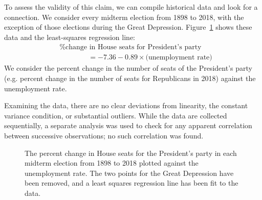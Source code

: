 To assess the validity of this claim, we can compile
historical data and look for a connection.
We consider every midterm election from 1898 to 2018,
with the exception of those elections during the Great
Depression.
Figure~\ref{unemploymentAndChangeInHouse} shows these data
and the least-squares regression line: \vspace{-2mm}
\begin{align*}
&\text{\% change in House seats for President's party}  \\
&\qquad\qquad= -7.36 - 0.89 \times \text{(unemployment rate)}
\end{align*}
We consider the percent change in the number of seats
of the President's party (e.g. percent change in the number
of seats for Republicans in 2018) against the unemployment
rate.

Examining the data, there are no clear deviations from
linearity, the constant variance condition,
or substantial outliers.
While the data are collected sequentially, a separate analysis
was used to check for any apparent correlation between successive
observations;
no such correlation was found.

\begin{figure}[h]
  \centering
  \caption{The percent change in House seats for the
      President's party in each midterm election from 1898 to 2018
      plotted against the unemployment rate.
      The two points for the Great Depression have been
      removed, and a least squares regression line has been
      fit to the data.}
  \label{unemploymentAndChangeInHouse}
\end{figure}


